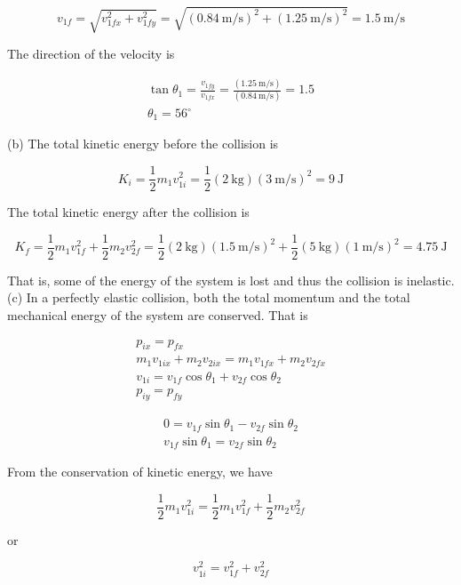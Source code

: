 \documentclass[10pt]{article}
\begin{document}
$$
v_{1 f}=\sqrt{v_{1 f x}^{2}+v_{1 f y}^{2}}=\sqrt{(0.84 \mathrm{~m} / \mathrm{s})^{2}+(1.25 \mathrm{~m} / \mathrm{s})^{2}}=1.5 \mathrm{~m} / \mathrm{s}
$$

The direction of the velocity is

$$
\begin{gathered}
\tan \theta_{1}=\frac{v_{1 f y}}{v_{1 f x}}=\frac{(1.25 \mathrm{~m} / \mathrm{s})}{(0.84 \mathrm{~m} / \mathrm{s})}=1.5 \\
\theta_{1}=56^{\circ}
\end{gathered}
$$

(b) The total kinetic energy before the collision is

$$
K_{i}=\frac{1}{2} m_{1} v_{1 i}^{2}=\frac{1}{2}(2 \mathrm{~kg})(3 \mathrm{~m} / \mathrm{s})^{2}=9 \mathrm{~J}
$$

The total kinetic energy after the collision is

$$
K_{f}=\frac{1}{2} m_{1} v_{1 f}^{2}+\frac{1}{2} m_{2} v_{2 f}^{2}=\frac{1}{2}(2 \mathrm{~kg})(1.5 \mathrm{~m} / \mathrm{s})^{2}+\frac{1}{2}(5 \mathrm{~kg})(1 \mathrm{~m} / \mathrm{s})^{2}=4.75 \mathrm{~J}
$$

That is, some of the energy of the system is lost and thus the collision is inelastic.\\
(c) In a perfectly elastic collision, both the total momentum and the total mechanical energy of the system are conserved. That is


\begin{gather*}
p_{i x}=p_{f x} \\
m_{1} v_{1 i x}+m_{2} v_{2 i x}=m_{1} v_{1 f x}+m_{2} v_{2 f x} \\
v_{1 i}=v_{1 f} \cos \theta_{1}+v_{2 f} \cos \theta_{2}  \tag{5.8}\\
p_{i y}=p_{f y}
\end{gather*}



\begin{gather*}
0=v_{1 f} \sin \theta_{1}-v_{2 f} \sin \theta_{2} \\
v_{1 f} \sin \theta_{1}=v_{2 f} \sin \theta_{2} \tag{5.9}
\end{gather*}


From the conservation of kinetic energy, we have

$$
\frac{1}{2} m_{1} v_{1 i}^{2}=\frac{1}{2} m_{1} v_{1 f}^{2}+\frac{1}{2} m_{2} v_{2 f}^{2}
$$

or


\begin{equation*}
v_{1 i}^{2}=v_{1 f}^{2}+v_{2 f}^{2} \tag{5.10}
\end{equation*}
\end{document}
